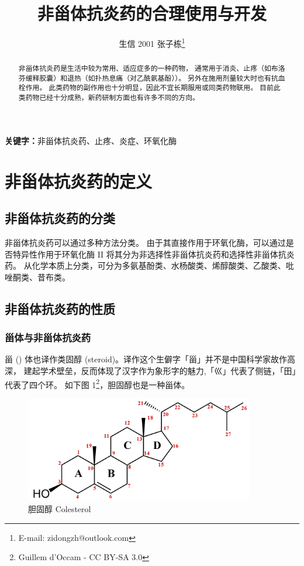 \documentclass[12pt, a4paper, oneside]{ctexart}
\title{非甾体抗炎药的合理使用与开发}
\author{生信 2001 张子栋\thanks{E-mail: zidongzh@outlook.com}}
\date{}
\begin{document}
\maketitle
\thispagestyle{empty}
\newpage

\tableofcontents

\thispagestyle{empty}
\setcounter{page}{0}

\newpage

\begin{abstract}
    非甾体抗炎药是生活中较为常用、适应症多的一种药物，
    通常用于消炎、止疼（如布洛芬缓释胶囊）和退热（如扑热息痛（对乙酰氨基酚））。
    另外在施用剂量较大时也有抗血栓作用。
    此类药物的副作用也十分明显，因此不宜长期服用或同类药物联用。
    目前此类药物已经十分成熟，新药研制方面也有许多不同的方向。
\end{abstract}

\textbf{关键字：}非甾体抗炎药、止疼、炎症、环氧化酶

\newpage
\section{非甾体抗炎药的定义}
\subsection{非甾体抗炎药的分类}
非甾体抗炎药可以通过多种方法分类。
由于其直接作用于环氧化酶，可以通过是否特异性作用于环氧化酶 II 
将其分为非选择性非甾体抗炎药和选择性非甾体抗炎药。
从化学本质上分类，可分为多氨基酚类、水杨酸类、烯醇酸类、乙酸类、吡唑酮类、昔布类。

\subsection{非甾体抗炎药的性质}
\subsubsection{甾体与非甾体抗炎药}
甾 ({}) 体也译作类固醇 (steroid)。译作这个生僻字「甾」并不是中国科学家故作高深，
建起学术壁垒，反而体现了汉字作为象形字的魅力,「巛」代表了侧链，「田」代表了四个环\cite{ref1}。
如下图 1\footnote{Guillem d'Occam - CC BY-SA 3.0}，胆固醇也是一种甾体。

\begin{figure}[htbp]
    \centering
    \includegraphics[width=10cm,height=4.625cm]{Colesterol.png}
    \caption{胆固醇 Colesterol}
    \end{figure} 
\end{document}
